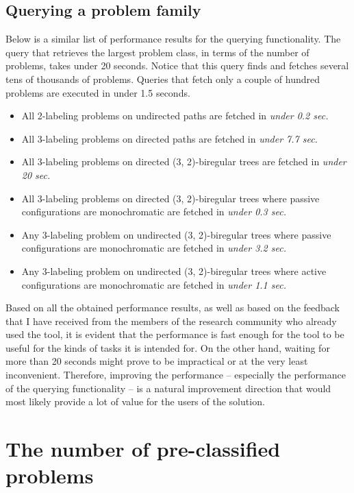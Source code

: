\subsection{Querying a problem family}

Below is a similar list of performance results for the querying
functionality. The query that retrieves the largest problem class, in terms of
the number of problems, takes under 20 seconds. Notice that this query
finds and fetches several tens of thousands of problems. Queries
that fetch only a couple of hundred problems are executed in under 1.5 seconds.

\begin{itemize}
  \item All 2-labeling problems on undirected paths are fetched in \emph{under 0.2 sec.}
  \item All 3-labeling problems on directed paths are fetched in \emph{under 7.7 sec.}
  \item All 3-labeling problems on directed (3, 2)-biregular trees are fetched in \emph{under 20 sec.}
  \item All 3-labeling problems on directed (3, 2)-biregular trees where passive configurations are monochromatic are fetched in \emph{under 0.3 sec.}
  \item Any 3-labeling problem on undirected (3, 2)-biregular trees where passive configurations are monochromatic are fetched in \emph{under 3.2 sec.}
  \item Any 3-labeling problem on undirected (3, 2)-biregular trees where active configurations are monochromatic are fetched in \emph{under 1.1 sec.}
\end{itemize}

Based on all the obtained performance results, as
well as based on the feedback that I have received
from the members of the research community who
already used the tool, it is
evident that the performance is fast enough for the
tool to be useful for the kinds of tasks it is intended for.
On the other hand, waiting for more than 20 seconds might prove
to be impractical or at the very least inconvenient.
Therefore, improving the
performance -- especially
the performance of the querying functionality -- is
a natural improvement direction that would most
likely provide a lot of value for the users of the solution.

\section{The number of pre-classified problems}


